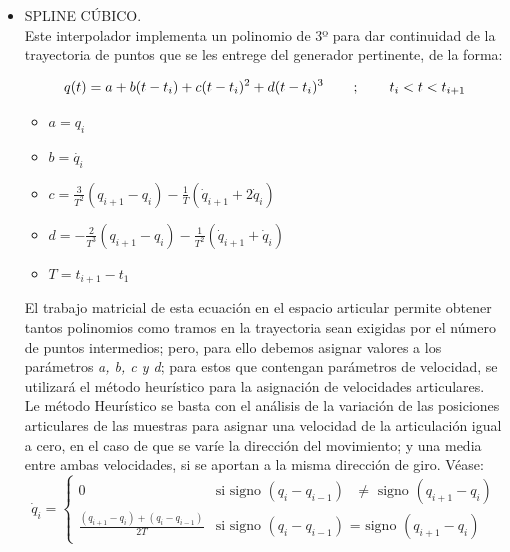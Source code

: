 	\begin{itemize}
		\item SPLINE CÚBICO.\\
		Este interpolador implementa un polinomio de 3º para dar continuidad de la trayectoria de puntos que se les entrege del
		generador pertinente, de la forma:
		\begin{center}
			\begin{equation}
				q(t)= a + b (t-t_{i}) +c (t-t_{i})^{2} + d (t-t_{i})^{3} \hspace{0.75cm};\hspace{0.75cm} t_{i}<t<t_{i+1}
			\end{equation}
			\begin{itemize}
				\item $a = q_{i} $
				\item $b = \dot{q_{i}} $
				\item $c= \frac{3}{T^{2}}(q_{i+1}-q_{i})-\frac{1}{T}(\dot{q}_{i+1}+2\dot{q}_{i})$
				\item $d= -\frac{2}{T^{3}}(q_{i+1}-q_{i})-\frac{1}{T^{2}}(\dot{q}_{i+1}+\dot{q}_{i})$
				\item $T=t_{i+1}-t_{1}$
			\end{itemize}
		\end{center}
		El trabajo matricial de esta ecuación en el espacio articular permite obtener tantos
		polinomios como tramos en la trayectoria sean exigidas por el número de puntos intermedios; pero, para ello debemos asignar valores a
		los parámetros \textit{a, b, c y d}; para estos que contengan parámetros de velocidad, se utilizará
		el método heurístico para la asignación de velocidades articulares.\\

		Le método Heurístico se basta con el análisis de la variación de las posiciones
		articulares de las muestras para asignar una velocidad de la articulación igual a cero, en el caso de que se varíe la
		dirección del movimiento; y una media entre ambas velocidades, si se aportan a la misma dirección de giro. Véase: \\

		\[
		\dot{q}_{i}= \left\{ \begin{array}{ll}
			0 & \textrm{si signo $(q_{i}-q_{i-1})$ $\neq$ signo $(q_{i+1}- q_{i})$} \\
			\frac{(q_{i+1}- q_{i})+(q_{i}-q_{i-1})}{2T} & \textrm{si signo $(q_{i}-q_{i-1})$ = signo $(q_{i+1}- q_{i})$}

		\end{array}\right.
		\]


	\end{itemize}




